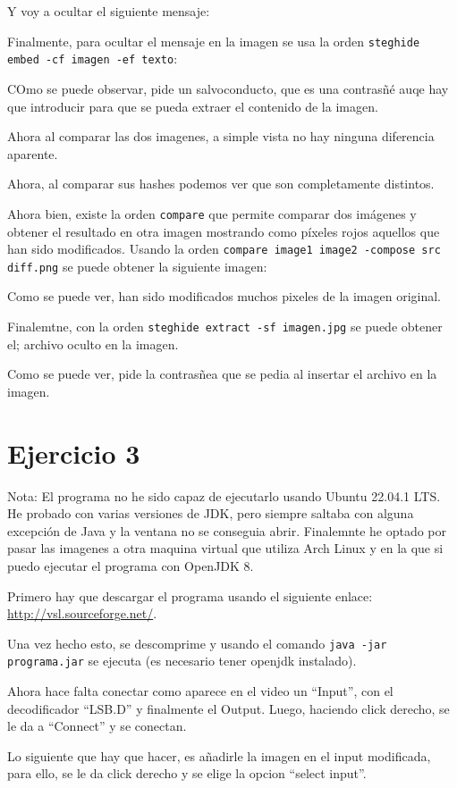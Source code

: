 \documentclass{article}
\begin{document}

Y voy a ocultar el siguiente mensaje:


Finalmente, para ocultar el mensaje en la imagen se usa la orden \verb|steghide embed -cf imagen -ef texto|:


COmo se puede observar, pide un salvoconducto, que es una contrasñé auqe hay que introducir para que se pueda extraer el contenido de la imagen.

Ahora al comparar las dos imagenes, a simple vista no hay ninguna diferencia aparente.


Ahora, al comparar sus hashes podemos ver que son completamente distintos.


Ahora bien, existe la orden \verb|compare| que permite comparar dos imágenes y obtener el resultado en otra imagen mostrando como píxeles rojos aquellos que han sido modificados. Usando la orden \verb|compare image1 image2 -compose src diff.png| se puede obtener la siguiente imagen:


Como se puede ver, han sido modificados muchos pixeles de la imagen original.

Finalemtne, con la orden \verb|steghide extract -sf imagen.jpg| se puede obtener el; archivo oculto en la imagen.


Como se puede ver, pide la contrasñea que se pedia al insertar el archivo en la imagen.


\section*{Ejercicio 3}
Nota: El programa no he sido capaz de ejecutarlo usando Ubuntu 22.04.1 LTS. He probado con varias versiones de JDK, pero siempre saltaba con alguna excepción de Java y la ventana no se conseguia abrir. Finalemnte he optado por pasar las imagenes a otra maquina virtual que utiliza Arch Linux y en la que si puedo ejecutar el programa con OpenJDK 8.


Primero hay que descargar el programa usando el siguiente enlace: \url{http://vsl.sourceforge.net/}.

Una vez hecho esto, se descomprime y usando el comando \verb|java -jar programa.jar| se ejecuta (es necesario tener openjdk instalado).


Ahora hace falta conectar como aparece en el video un ``Input'', con el decodificador ``LSB.D'' y finalmente el Output. Luego, haciendo click derecho, se le da a ``Connect'' y se conectan.


Lo siguiente que hay que hacer, es añadirle la imagen en el input modificada, para ello, se le da click derecho y se elige la opcion ``select input''.
\end{document}
